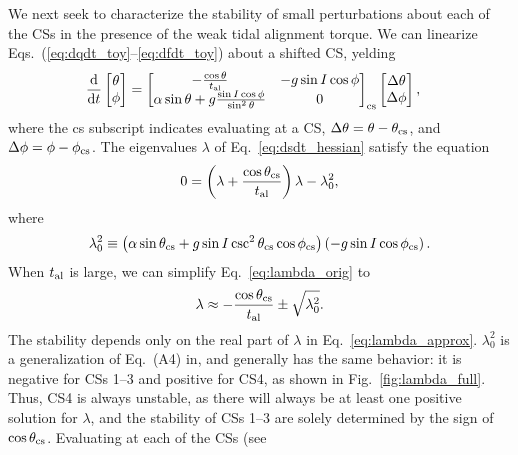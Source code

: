 \documentclass[
        fleqn,
        usenatbib,
    ]{mnras}
\newcommand*{\rd}[2]{\frac{\mathrm{d}#1}{\mathrm{d}#2}}
\newcommand*{\p}[1]{\left(#1\right)}
\begin{document}
We next seek to characterize the stability of small perturbations about each of
the CSs in the presence of the weak tidal alignment torque. We can linearize
Eqs.~(\ref{eq:dqdt_toy}--\ref{eq:dfdt_toy}) about a shifted CS, yelding
\begin{align}
    \rd{}{t}\begin{bmatrix}
        \theta\\ \phi
    \end{bmatrix} &= \begin{bmatrix}
        -\frac{\cos \theta}{t_{\rm al}} &
        -g\sin I \cos \phi \\
        \alpha \sin \theta + g\frac{\sin I \cos \phi}{\sin^2\theta} &
        0
    \end{bmatrix}_{\rm cs}\begin{bmatrix}
        \Delta \theta \\ \Delta \phi
    \end{bmatrix},\label{eq:dsdt_hessian}
\end{align}
where the cs subscript indicates evaluating at a CS, $\Delta \theta = \theta -
\theta_{\rm cs}$, and $\Delta \phi = \phi - \phi_{\rm cs}$. The eigenvalues
$\lambda$ of Eq.~\eqref{eq:dsdt_hessian} satisfy the equation
\begin{equation}
    0 = \p{\lambda + \frac{\cos \theta_{\rm cs}}{t_{\rm al}}}\lambda
        - \lambda_0^2,\label{eq:lambda_orig}
\end{equation}
where
\begin{equation}
    \lambda_0^2 \equiv \p{\alpha
        \sin \theta_{\rm cs} + g\sin I \csc^2\theta_{\rm cs}\cos \phi_{\rm cs}}
            \p{- g \sin I \cos \phi_{\rm cs}}\label{eq:def_l0_sq}.
\end{equation}
When $t_{\rm al}$ is large, we can simplify Eq.~\eqref{eq:lambda_orig} to
\begin{equation}
    \lambda \approx -\frac{\cos \theta_{\rm cs}}{t_{\rm al}}
        \pm \sqrt{\lambda_0^2}. \label{eq:lambda_approx}
\end{equation}
The stability depends only on the real part of $\lambda$ in
Eq.~\eqref{eq:lambda_approx}. $\lambda_0^2$ is a generalization of Eq.~(A4)
in, \citet{su2020} and generally has the same behavior: it is negative for CSs
1--3 and positive for CS4, as shown in Fig.~\ref{fig:lambda_full}. Thus, CS4 is
always unstable, as there will always be at least one positive solution for
$\lambda$, and the stability of CSs 1--3 are solely determined by the sign of
$\cos \theta_{\rm cs}$. Evaluating at each of the CSs (see
\end{document}
